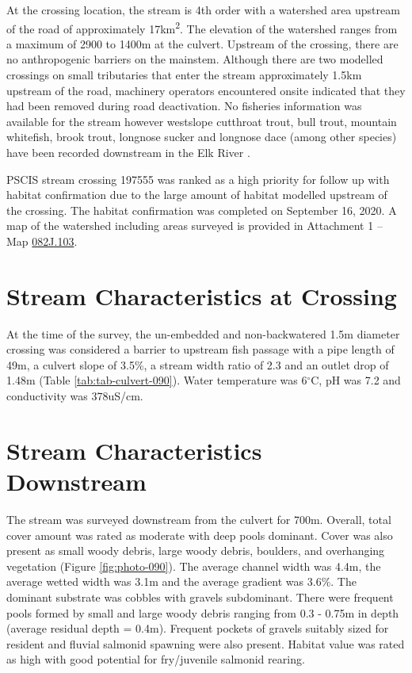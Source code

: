 \documentclass[
]{book}
\begin{document}
At the crossing location, the stream is 4th order with a watershed area upstream of the road of approximately 17km\textsuperscript{2}. The elevation of the watershed ranges from a maximum of 2900 to 1400m at the culvert. Upstream of the crossing, there are no anthropogenic barriers on the mainstem. Although there are two modelled crossings on small tributaries that enter the stream approximately 1.5km upstream of the road, machinery operators encountered onsite indicated that they had been removed during road deactivation. No fisheries information was available for the stream \citep{moeStreamInventorySample} however westslope cutthroat trout, bull trout, mountain whitefish, brook trout, longnose sucker and longnose dace (among other species) have been recorded downstream in the Elk River \citep{data_fish_obs}.

PSCIS stream crossing 197555 was ranked as a high priority for follow up with habitat confirmation due to the large amount of habitat modelled upstream of the crossing. The habitat confirmation was completed on September 16, 2020. A map of the watershed including areas surveyed is provided in Attachment 1 -- Map \url{082J.103}.

\hypertarget{stream-characteristics-at-crossing-3}{%
\section*{Stream Characteristics at Crossing}\label{stream-characteristics-at-crossing-3}}

At the time of the survey, the un-embedded and non-backwatered 1.5m diameter crossing was considered a barrier to upstream fish passage with a pipe length of 49m, a culvert slope of 3.5\%, a stream width ratio of 2.3 and an outlet drop of 1.48m (Table \ref{tab:tab-culvert-090}). Water temperature was 6\(^\circ\)C, pH was 7.2 and conductivity was 378uS/cm.

\hypertarget{stream-characteristics-downstream-3}{%
\section*{Stream Characteristics Downstream}\label{stream-characteristics-downstream-3}}

The stream was surveyed downstream from the culvert for 700m. Overall, total cover amount was rated as moderate with deep pools dominant. Cover was also present as small woody debris, large woody debris, boulders, and overhanging vegetation (Figure \ref{fig:photo-090}). The average channel width was 4.4m, the average wetted width was 3.1m and the average gradient was 3.6\%. The dominant substrate was cobbles with gravels subdominant. There were frequent pools formed by small and large woody debris ranging from 0.3 - 0.75m in depth (average residual depth = 0.4m). Frequent pockets of gravels suitably sized for resident and fluvial salmonid spawning were also present. Habitat value was rated as high with good potential for fry/juvenile salmonid rearing.
\end{document}
